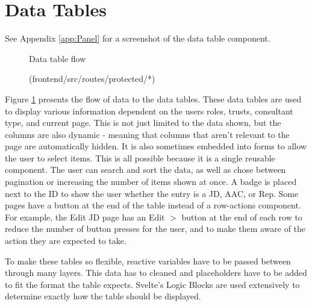 \section{Data Tables} \label{Data Tables}
\vspace{-5pt}
{\footnotesize See Appendix \ref{app:Panel} for a screenshot of the data table component.}
\vspace{-5pt}
\begin{figure}[h]
\centering
{}
\vspace{-15pt}
\caption{Data table flow}
\vspace{-10pt}
\caption*{(frontend/src/routes/protected/*)}
\label{fig:data-table-flow}
\end{figure}

Figure \ref{fig:data-table-flow} presents the flow of data to the data tables. These data tables are used to display various information dependent on the users roles, trusts, consultant type, and current page. This is not just limited to the data shown, but the columns are also dynamic - meaning that columns that aren't relevant to the page are automatically hidden. It is also sometimes embedded into forms to allow the user to select items. This is all possible because it is a single reusable component. The user can search and sort the data, as well as chose between pagination or increasing the number of items shown at once. A badge is placed next to the ID to show the user whether the entry is a JD, AAC, or Rep. Some pages have a button at the end of the table instead of a row-actions component. For example, the Edit JD page has an Edit $>$ button at the end of each row to reduce the number of button presses for the user, and to make them aware of the action they are expected to take.

To make these tables so flexible, reactive variables have to be passed between through many layers. This data has to cleaned and placeholders have to be added to fit the format the table expects. Svelte's Logic Blocks are used extensively to determine exactly how the table should be displayed.


